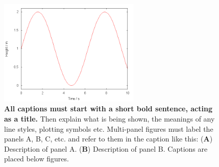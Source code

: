 \documentclass[12pt]{article}
\begin{document}
\begin{figure} %
	\centering
	\includegraphics[width=0.6\textwidth]{example_figure} %

	\caption{\textbf{All captions must start with a short bold sentence, acting as a title.}
		Then explain what is being shown, the meanings of any line styles, plotting symbols etc.
		Multi-panel figures must label the panels A, B, C, etc. and refer to them in the caption
		like this: (\textbf{A}) Description of panel A. (\textbf{B}) Description of panel B.
		Captions are placed below figures.}
	\label{fig:example} %
\end{figure}


\clearpage %

%

\end{document}
